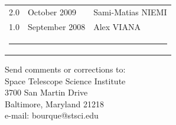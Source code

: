 \begin{titlepage}
\begin{table}[h]
\begin{tabular}{lll}
      2.0                 &  October 2009  & Sami-Matias NIEMI  \\ 
      1.0                 &  September 2008  & Alex VIANA  \\ 
 
 
 \multicolumn{3}{c}{ \rule{130mm}{0.8mm}}      \\    
\end{tabular}
\end{table}%


\vspace{120mm}

\begin{flushright}
Send comments or corrections to: \\
Space Telescope Science Institute \\
3700 San Martin Drive \\
Baltimore, Maryland 21218 \\
e-mail: bourque@stsci.edu
 \end{flushright}
\end{titlepage}
